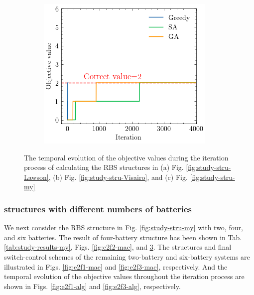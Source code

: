 \documentclass{article}
\begin{document}
\begin{figure}[htbp]
\begin{subfigure}[b]{0.32\textwidth}
        \caption{}
        \label{fig:f4-alg}
    \end{subfigure}
    \begin{subfigure}[b]{0.32\textwidth}
        \includegraphics[width=\textwidth]{e2f2-alg}
        \caption{}
        \label{fig:e2f2-alg}
    \end{subfigure}
    \caption{The temporal evolution of the objective values during the iteration process of calculating the RBS structures in (a) Fig. \ref{fig:study-stru-Lawson}, (b) Fig. \ref{fig:study-stru-Visairo}, and (c) Fig. \ref{fig:study-stru-my}}
\end{figure}

\subsubsection{structures with different numbers of batteries}

We next consider the RBS structure in Fig. \ref{fig:study-stru-my} with two, four, and six batteries.
The result of four-battery structure has been shown in Tab. \ref{tab:study-results-my}, Figs. \ref{fig:e2f2-mac}, and \ref{fig:e2f2-alg}. 
The structures and final switch-control schemes of the remaining two-battery and six-battery systems are illustrated in Figs. \ref{fig:e2f1-mac} and \ref{fig:e2f3-mac}, respectively. 
And the temporal evolution of the objective values throughout the iteration process are shown in Figs. \ref{fig:e2f1-alg} and \ref{fig:e2f3-alg}, respectively.
\end{document}
